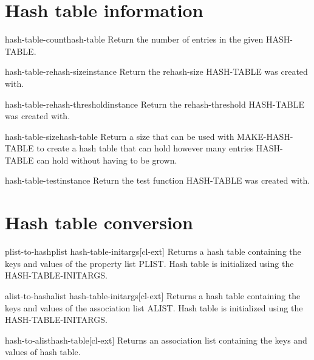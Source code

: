 \documentclass[10pt,english]{book}
\begin{document}
\section{Hash table information}
\label{sec:hash-table-inform}

\begin{function}{hash-table-count}{hash-table}
  Return the number of entries in the given HASH-TABLE.
\end{function}

\begin{function}{hash-table-rehash-size}{instance}
  Return the rehash-size HASH-TABLE was created with.
\end{function}

\begin{function}{hash-table-rehash-threshold}{instance}
  Return the rehash-threshold HASH-TABLE was created with.
\end{function}

\begin{function}{hash-table-size}{hash-table}
  Return a size that can be used with MAKE-HASH-TABLE to create a hash
   table that can hold however many entries HASH-TABLE can hold without
   having to be grown.
\end{function}

\begin{function}{hash-table-test}{instance}
  Return the test function HASH-TABLE was created with.
\end{function}

\section{Hash table conversion}
\label{sec:hash-table-conv}

\begin{function}{plist-to-hash}{plist \rest hash-table-initargs}[cl-ext]
  Returns a hash table containing the keys and values of the property list
PLIST. Hash table is initialized using the HASH-TABLE-INITARGS.
\end{function}

\begin{function}{alist-to-hash}{alist \rest hash-table-initargs}[cl-ext]
  Returns a hash table containing the keys and values of the association list
ALIST. Hash table is initialized using the HASH-TABLE-INITARGS.
\end{function}

\begin{function}{hash-to-alist}{hash-table}[cl-ext]
  Returns an association list containing the keys and values of hash
  table.
\end{function}
\end{document}
